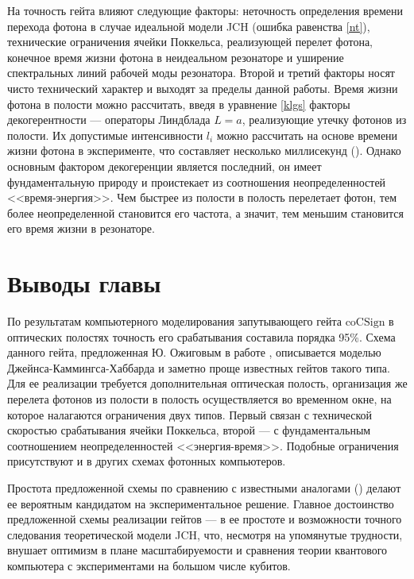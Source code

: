 На точность гейта влияют следующие факторы: неточность определения времени перехода фотона в случае идеальной модели JCH (ошибка равенства \eqref{nt}), технические ограничения ячейки Поккельса, реализующей перелет фотона, конечное время жизни фотона в неидеальном резонаторе и уширение спектральных линий рабочей моды резонатора. Второй и третий факторы носят чисто технический характер и выходят за пределы данной работы. Время жизни фотона в полости можно рассчитать, введя в уравнение \eqref{klgs} факторы декогерентности --- операторы Линдблада $L = a$, реализующие утечку фотонов из полости. Их допустимые интенсивности $l_{i}$ можно рассчитать на основе времени жизни фотона в эксперименте, что составляет несколько миллисекунд (\cite{rempe}). Однако основным фактором декогеренции является последний, он имеет фундаментальную природу и проистекает из соотношения неопределенностей <<время-энергия>>. Чем быстрее из полости в полость перелетает фотон, тем более неопределенной становится его частота, а значит, тем меньшим становится его время жизни в резонаторе.

\section{Выводы главы}\label{sec:ch5/sect3}

По результатам компьютерного моделирования запутывающего гейта $\text{coCSign}$ в оптических полостях точность его срабатывания составила порядка 95\%. Схема данного гейта, предложенная Ю. Ожиговым в работе \cite{quantum_gates_asynchronous}, описывается моделью Джейнса-Каммингса-Хаббарда и заметно проще известных гейтов такого типа. Для ее реализации требуется дополнительная оптическая полость, организация же перелета фотонов из полости в полость осуществляется во временном окне, на которое налагаются ограничения двух типов. Первый связан с технической скоростью срабатывания ячейки Поккельса, второй --- с фундаментальным соотношением неопределенностей <<энергия-время>>. Подобные ограничения присутствуют и в других схемах фотонных компьютеров.

Простота предложенной схемы по сравнению с известными аналогами (\cite{azuma}) делают ее вероятным кандидатом на экспериментальное решение. Главное достоинство предложенной схемы реализации гейтов --- в ее простоте и возможности точного следования теоретической модели JCH, что, несмотря на упомянутые трудности, внушает оптимизм в плане масштабируемости и сравнения теории квантового компьютера с экспериментами на большом числе кубитов.
